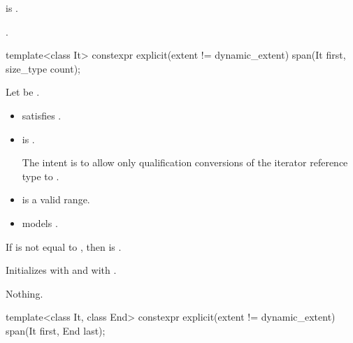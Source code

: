 \begin{itemdescr}
\pnum
\constraints
{} is .

\pnum
\ensures
.
\end{itemdescr}

%
\begin{itemdecl}
template<class It>
  constexpr explicit(extent != dynamic_extent) span(It first, size_type count);
\end{itemdecl}

\begin{itemdescr}
\pnum
\constraints
Let  be .
\begin{itemize}
\item {} satisfies .
\item
{} is .
\begin{note}
The intent is to allow only qualification conversions
of the iterator reference type to .
\end{note}
\end{itemize}

\pnum
\expects
\begin{itemize}
\item {} is a valid range.
\item {} models .
\end{itemize}

\pnum
\hardexpects
If  is not equal to ,
then  is .

\pnum
\effects
Initializes  with  and
 with .

\pnum
\throws
Nothing.
\end{itemdescr}

%
\begin{itemdecl}
template<class It, class End>
  constexpr explicit(extent != dynamic_extent) span(It first, End last);
\end{itemdecl}

